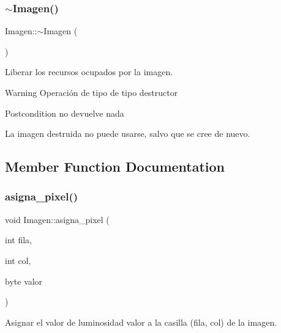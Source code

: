 \subsubsection{\texorpdfstring{$\sim$\+Imagen()}{~Imagen()}}
{\footnotesize\ttfamily Imagen\+::$\sim$\+Imagen (\begin{DoxyParamCaption}{ }\end{DoxyParamCaption})}



Liberar los recursos ocupados por la imagen. 

\begin{DoxyWarning}{Warning}
Operación de tipo de tipo destructor 
\end{DoxyWarning}
\begin{DoxyPostcond}{Postcondition}
no devuelve nada 

La imagen destruida no puede usarse, salvo que se cree de nuevo. 
\end{DoxyPostcond}


\subsection{Member Function Documentation}
\mbox{\label{classImagen_af9ac39daf075288473967839d9a0d2d8}} 
\subsubsection{\texorpdfstring{asigna\+\_\+pixel()}{asigna\_pixel()}}
{\footnotesize\ttfamily void Imagen\+::asigna\+\_\+pixel (\begin{DoxyParamCaption}\item[{int}]{fila,  }\item[{int}]{col,  }\item[{byte}]{valor }\end{DoxyParamCaption})}



Asignar el valor de luminosidad valor a la casilla (fila, col) de la imagen. 


